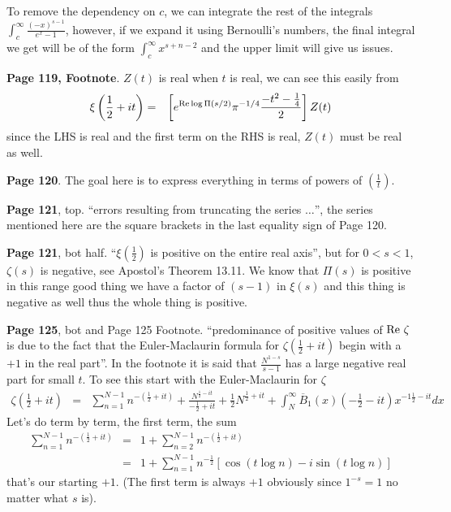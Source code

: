 \documentclass[aps,preprint,preprintnumbers,nofootinbib,showpacs,prd]{revtex4-1}
\newcommand{\nbea}{\begin{eqnarray*}}
\newcommand{\neea}{\end{eqnarray*}}
\newcommand{\re}{{\rm Re}}
\begin{document}
To remove the dependency on $c$, we can integrate the rest of the integrals $\int_c^\infty \frac{(-x)^{s-1}}{e^x - 1}$, however, if we expand it using Bernoulli's numbers, the final integral we get will be of the form $\int_c^\infty x^{s + n -2}$ and the upper limit will give us issues.

{\bf Page 119, Footnote}. $Z(t)$ is real when $t$ is real, we can see this easily from 
%
\nbea
\xi\left(\frac{1}{2} + it\right) & = & \left \lbrack e^{\re \log \Pi(s/2)} \pi^{-1/4} \frac{-t^2 - \frac{1}{4}}{2} \right \rbrack Z(t)
\neea
%
since the LHS is real and the first term on the RHS is real, $Z(t)$ must be real as well.

{\bf Page 120}. The goal here is to express everything in terms of powers of $\left(\frac{1}{t}\right)$.

{\bf Page 121}, top. ``errors resulting from truncating the series $\dots$'', the series mentioned here are the square brackets in the last equality sign of Page 120.

{\bf Page 121}, bot half. ``$\xi(\tfrac{1}{2})$ is positive on the entire real axis'', but for $0 < s < 1$, $\zeta(s)$ is negative, see Apostol's Theorem 13.11. We know that $\Pi(s)$ is positive in this range good thing we have a factor of $(s-1)$ in $\xi(s)$ and this thing is negative as well thus the whole thing is positive.

{\bf Page 125}, bot and Page 125 Footnote. ``predominance of positive values of $\re~\zeta$ is due to the fact that the Euler-Maclaurin formula for $\zeta(\tfrac{1}{2} + it)$ begin with a $+1$ in the real part''. In the footnote it is said that $\frac{N^{1-s}}{s-1}$ has a large negative real part for small $t$. To see this start with the Euler-Maclaurin for $\zeta$
%
\nbea
\zeta(\tfrac{1}{2} + it) & = & \sum_{n=1}^{N-1} n^{-(\tfrac{1}{2} + it)} + \frac{N^{\tfrac{1}{2} - it}}{-\tfrac{1}{2} + it} + \frac{1}{2} N^{\tfrac{1}{2} + it} + \int_N^\infty \overline{B}_1(x)(-\tfrac{1}{2} - it) x^{-1\tfrac{1}{2} - it} dx
\neea
%
Let's do term by term, the first term, the sum
%
\nbea
\sum_{n=1}^{N-1} n^{-(\tfrac{1}{2} + it)} & = & 1 + \sum_{n=2}^{N-1} n^{-(\tfrac{1}{2} + it)} \\
& = & 1 + \sum_{n=1}^{N-1} n^{-\tfrac{1}{2}} [\cos(t \log n) - i\sin (t\log n)]
\neea
%
that's our starting $+1$. (The first term is always $+1$ obviously since $1^{-s} = 1$ no matter what $s$ is).
\end{document}
